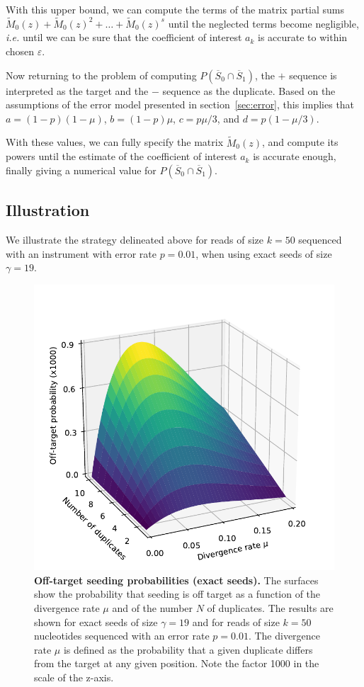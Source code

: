 \documentclass{article}
\begin{document}
With this upper bound, we can compute the terms of the matrix partial sums
$\tilde{M}_0(z) + \tilde{M}_0(z)^2 + \ldots + \tilde{M}_0(z)^s$ until the
neglected terms become negligible, \textit{i.e.} until we can be sure that
the coefficient of interest $a_k$ is accurate to within chosen
$\varepsilon$.

Now returning to the problem of computing $P(\overline{S}_0 \cap
\overline{S}_1)$, the $+$ sequence is interpreted as the target and the
$-$ sequence as the duplicate. Based on the assumptions of the error model
presented in section~\ref{sec:error}, this implies that $a =
(1-p)(1-\mu)$, $b = (1-p)\mu$, $c = p\mu/3$, and $d = p(1-\mu/3)$.

With these values, we can fully specify the matrix $\tilde{M}_0(z)$, and
compute its powers until the estimate of the coefficient of interest $a_k$
is accurate enough, finally giving a numerical value for $P(\overline{S}_0
\cap \overline{S}_1)$.


\subsection{Illustration}
\label{sec:illdual}

We illustrate the strategy delineated above for reads of size $k=50$
sequenced with an instrument with error rate $p=0.01$, when using exact
seeds of size $\gamma=19$.

\begin{figure}[h]
\centering
\includegraphics[scale=0.65]{curves_exact.pdf}
\caption{\textbf{Off-target seeding probabilities (exact seeds).} The
surfaces show the probability that seeding is off target as a function of
the divergence rate $\mu$ and of the number $N$ of duplicates. The results
are shown for exact seeds of size $\gamma=19$ and for reads of size $k=50$
nucleotides sequenced with an error rate $p=0.01$. The divergence rate
$\mu$ is defined as the probability that a given duplicate differs from
the target at any given position. Note the factor 1000 in the scale of the
z-axis.}
\label{fig:curves_exact}
\end{figure}
\end{document}

